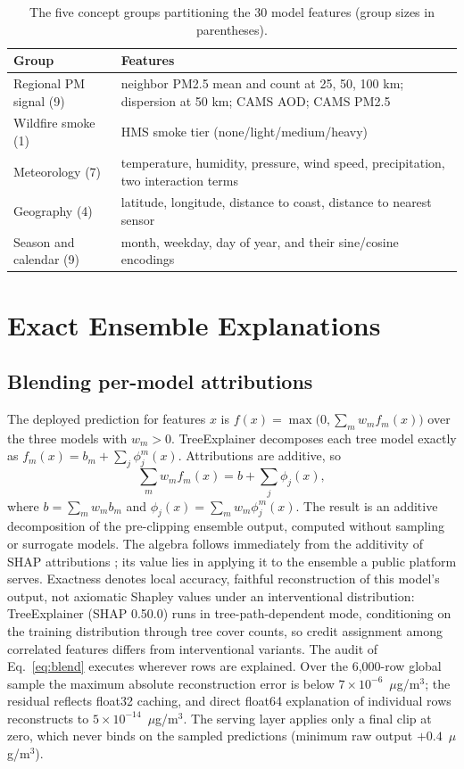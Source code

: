 \documentclass[conference]{IEEEtran}
\newcommand{\ugm}{$\mu$g/m$^3$}
\begin{document}
\begin{table}[!t]
\caption{The five concept groups partitioning the 30 model features
(group sizes in parentheses).}
\label{tab:groups}
\centering
\footnotesize
\begin{tabular}{>{\raggedright\arraybackslash}p{}>{\raggedright\arraybackslash}p{}}
\toprule
Group & Features \\
\midrule
Regional PM signal (9) & neighbor PM2.5 mean and count at 25, 50, 100 km;
dispersion at 50 km; CAMS AOD; CAMS PM2.5 \\
Wildfire smoke (1) & HMS smoke tier (none/light/medium/heavy) \\
Meteorology (7) & temperature, humidity, pressure, wind speed,
precipitation, two interaction terms \\
Geography (4) & latitude, longitude, distance to coast, distance to
nearest sensor \\
Season and calendar (9) & month, weekday, day of year, and their
sine/cosine encodings \\
\bottomrule
\end{tabular}
\end{table}

\section{Exact Ensemble Explanations}
\subsection{Blending per-model attributions}
The deployed prediction for features $x$ is
$f(x)=\max\bigl(0,\sum_m w_m f_m(x)\bigr)$ over the three models with
$w_m>0$. TreeExplainer \cite{lundberg2020} decomposes each tree model
exactly as $f_m(x)=b_m+\sum_j \phi^m_j(x)$. Attributions are additive, so
\begin{equation}
\sum_m w_m f_m(x) = b + \sum_j \phi_j(x),
\label{eq:blend}
\end{equation}
where $b=\sum_m w_m b_m$ and $\phi_j(x)=\sum_m w_m \phi^m_j(x)$. The
result is an additive decomposition of the pre-clipping ensemble output,
computed without sampling or surrogate models. The algebra follows
immediately from the additivity of SHAP attributions \cite{lundberg2017};
its value lies in applying it to the ensemble a public platform serves. Exactness denotes local accuracy, faithful reconstruction of this
model's output, not axiomatic Shapley values under an interventional
distribution: TreeExplainer (SHAP 0.50.0) runs in tree-path-dependent
mode, conditioning on the training distribution through tree cover
counts, so credit assignment among correlated features differs from
interventional variants. The audit of Eq.~\eqref{eq:blend} executes
wherever rows are explained. Over the 6,000-row global sample the maximum
absolute reconstruction error is below $7\times10^{-6}$~\ugm{}; the
residual reflects float32 caching, and
direct float64 explanation of individual rows reconstructs to
$5\times10^{-14}$~\ugm{}. The serving layer applies only a final clip at
zero, which never binds on the sampled predictions (minimum raw output
$+0.4$~\ugm{}).
\end{document}
